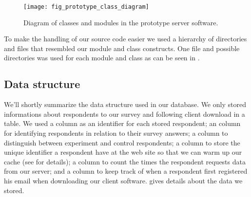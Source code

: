 \begin{figure}
  \begin{whole}
    \texttt{[image: fig\_prototype\_class\_diagram]}
    \caption[Prototype Class Diagram]{
      Diagram of classes and modules in the prototype server software.
    }
    \label{figure:fig.prototype.class.diagram}
  \end{whole}
\end{figure}

To make the handling of our source code easier we used a hierarchy of
directories and files that resembled our module and class constructs. One
file and possible directories was used for each module and class
as can be seen in .

\subsection{Data structure}

We'll shortly summarize the data structure used in our database. We
only stored informations about respondents to our survey and following
client download in a  table. We used a  column as
an identifier for each stored respondent; an  column for
identifying respondents in relation to their survey answers; a 
column to distinguish between experiment and control respondents; a
 column to store the unique identifier a respondent have at
the \urort{} web site so that we can warm up our cache (see
 for details);
a  column to count the times the respondent requests data from
our server; and a  column to keep track of when a respondent
first registered his email when downloading our client software.
gives details about the data we stored.

